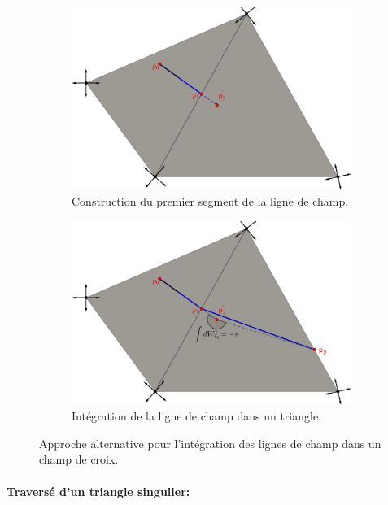 \begin{figure}[!h]
     \centering
     \begin{subfigure}[b]{0.7\textwidth}
         \centering
         \includegraphics[width=\textwidth]{images/draw_streams_21.pdf}
         \caption{Construction du premier segment de la ligne de champ.}
     \end{subfigure}
     \begin{subfigure}[b]{0.7\textwidth}
         \centering
         \includegraphics[width=\textwidth]{images/draw_streams_22.pdf}
         \caption{Intégration de la ligne de champ dans un triangle.}
     \end{subfigure}
        \caption{Approche alternative pour l'intégration des lignes de champ dans un champ de croix.}
        \label{fig:draw_streams_2}
\end{figure}

\paragraph{Traversé d'un triangle singulier:}

